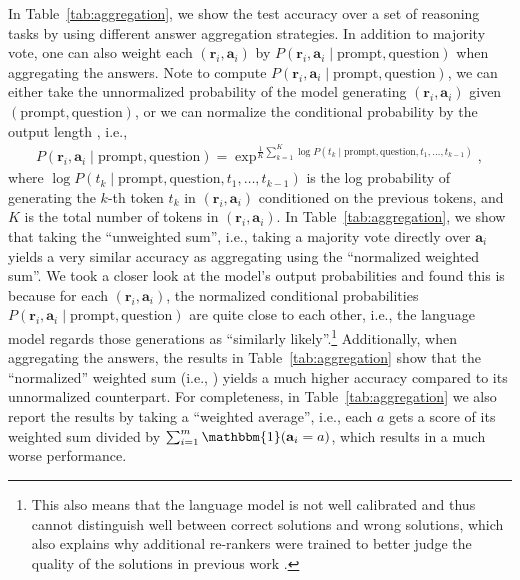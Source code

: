 \documentclass{article} %
\begin{document}
In Table~\ref{tab:aggregation}, we show the test accuracy over a set of reasoning tasks by using different answer aggregation strategies.
In addition to majority vote, one can also weight each $(\mathbf{r}_i, \mathbf{a}_i)$ by $P(\mathbf{r}_i, \mathbf{a}_i \mid \text{prompt}, \text{question})$ when aggregating the answers.
Note to compute $P(\mathbf{r}_i, \mathbf{a}_i \mid \text{prompt}, \text{question})$, we can either take the unnormalized probability of the model generating $(\mathbf{r}_i, \mathbf{a}_i)$ given $(\text{prompt}, \text{question})$, or we can normalize the conditional probability by the output length \citep{brown2020language}, i.e., 
\begin{align}
\label{eq2}
P(\mathbf{r}_i, \mathbf{a}_i \mid \text{prompt}, \text{question}) = \exp^{\frac{1}{K}\sum_{k=1}^K {\log P(t_k \mid \text{prompt}, \text{question}, t_1, \ldots, t_{k-1})}},
\end{align}
where $\log P(t_k \mid \text{prompt}, \text{question}, t_1, \ldots, t_{k-1})$ is the log probability of generating the $k$-th token $t_k$ in $(\mathbf{r}_i, \mathbf{a}_i)$ conditioned on the previous tokens, and $K$ is the total number of tokens in $(\mathbf{r}_i, \mathbf{a}_i)$.
In Table~\ref{tab:aggregation}, we show that taking the ``unweighted sum'', i.e., taking a majority vote directly over $\mathbf{a}_i$ yields a very similar accuracy as aggregating using the ``normalized weighted sum''.
We took a closer look at the model's output probabilities and found this is because for each $(\mathbf{r}_i, \mathbf{a}_i)$, the normalized conditional probabilities $P(\mathbf{r}_i, \mathbf{a}_i \mid \text{prompt}, \text{question})$ are quite close to each other, i.e., the language model regards those generations as ``similarly likely''.\footnote{This also means that the language model is not well calibrated and thus cannot distinguish well between correct solutions and wrong solutions, which also explains why additional re-rankers were trained to better judge the quality of the solutions in previous work \citep{cobbe2021training,thoppilan2022lamda}.}
Additionally, when aggregating the answers, the results in Table~\ref{tab:aggregation} show that the ``normalized'' weighted sum (i.e., ) yields a much higher accuracy compared to its unnormalized counterpart.
For completeness, in Table~\ref{tab:aggregation} we also report the results by taking a ``weighted average'', i.e., each $a$ gets a score of its weighted sum divided by $\sum\nolimits_{i=1}^m \mathbbm{1} (\mathbf{a}_i = a)$, which results in a much worse performance.
\end{document}
